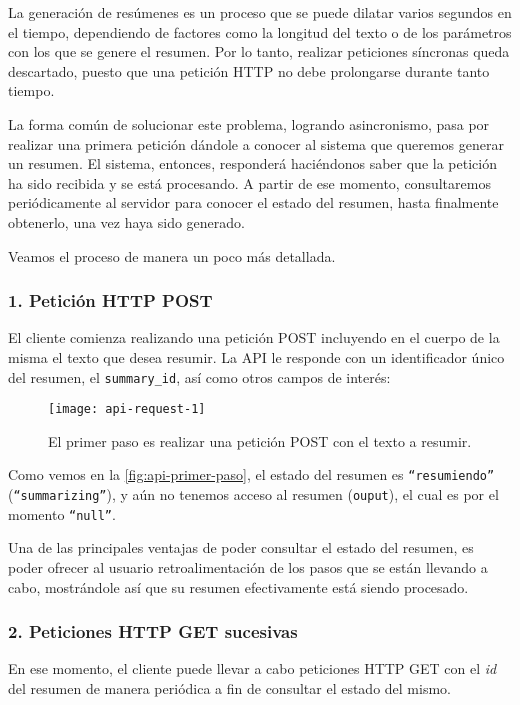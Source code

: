 La generación de resúmenes es un proceso que se puede dilatar varios segundos en el tiempo, dependiendo de factores como la longitud del texto o de los parámetros con los que se genere el resumen. Por lo tanto, realizar peticiones síncronas queda descartado, puesto que una petición HTTP no debe prolongarse durante tanto tiempo.

La forma común de solucionar este problema, logrando asincronismo, pasa por realizar una primera petición dándole a conocer al sistema que queremos generar un resumen. El sistema, entonces, responderá haciéndonos saber que la petición ha sido recibida y se está procesando. A partir de ese momento, consultaremos periódicamente al servidor para conocer el estado del resumen, hasta finalmente obtenerlo, una vez haya sido generado.

Veamos el proceso de manera un poco más detallada.

\subsubsection{1. Petición HTTP POST}

El cliente comienza realizando una petición POST incluyendo en el cuerpo de la misma el texto que desea resumir. La API le responde con un identificador único del resumen, el \texttt{summary\_id}, así como otros campos de interés:

\begin{figure}[h]
	\centering
	\texttt{[image: api-request-1]}
	\caption[Primer paso: realizar una petición POST.]{El primer paso es realizar una petición POST con el texto a resumir.}
	\label{fig:api-primer-paso}
\end{figure}

Como vemos en la \autoref{fig:api-primer-paso}, el estado del resumen es \texttt{``resumiendo''} (\texttt{``summarizing''}), y aún no tenemos acceso al resumen (\texttt{ouput}), el cual es por el momento \texttt{``null''}.

Una de las principales ventajas de poder consultar el estado del resumen, es poder ofrecer al usuario retroalimentación de los pasos que se están llevando a cabo, mostrándole así que su resumen efectivamente está siendo procesado.

\subsubsection{2. Peticiones HTTP GET sucesivas}

En ese momento, el cliente puede llevar a cabo peticiones HTTP GET con el \emph{id} del resumen de manera periódica a fin de consultar el estado del mismo.

